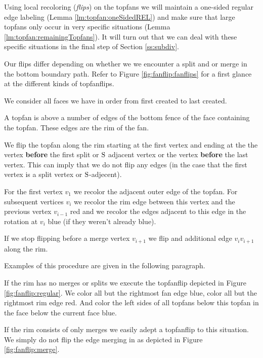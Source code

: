 Using local recoloring (\emph{flips}) on the topfans we will maintain a one-sided regular edge labeling (Lemma \ref{lm:topfan:oneSidedREL}) and make sure that large topfans only occur in very specific situations (Lemma \ref{lm:topfan:remainingTopfans}). It will turn out that we can deal with these specific situations in the final step of Section \ref{ss:subdiv}.

Our flips differ depending on whether we we encounter a split and or merge in the bottom boundary path. Refer to Figure \ref{fig:fanflip:fanflips} for a first glance at the different kinds of topfanflips.






We consider all faces we have in order from first created to last created.

A topfan is above a number of edges of the bottom fence of the face containing the topfan. These edges are the rim of the fan.

We flip the topfan along the rim starting at the first vertex and ending at the the vertex \textbf{before} the first split or $\mathrm{S}$ adjacent vertex or the vertex \textbf{before} the last vertex. This can imply that we do not flip any edges (in the case that the first vertex is a split vertex or $\mathrm{S}$-adjecent).


For the first vertex $v_1$ we recolor the adjacent outer edge of the topfan. For subsequent vertices $v_i$ we recolor the rim edge between this vertex and the previous vertex $v_{i-1}$ red and we recolor the edges adjacent to this edge in the rotation at $v_i$ blue (if they weren't already blue).

If we stop flipping before a merge vertex $v_{i+1}$ we flip and additional edge $v_i v_{i+1}$ along the rim.

Examples of this procedure are given in the following paragraph.


If the rim has no merges or splits we execute the topfanflip depicted in Figure \ref{fig:fanflip:regular}. We color all but the rightmost fan edge blue, color all but the rightmost rim edge red. And color the left sides of all topfans below this topfan in the face below the current face blue.

If the rim consists of only merges we easily adept a topfanflip to this situation. We simply do not flip the edge merging in as depicted in Figure \ref{fig:fanflip:merge}.

